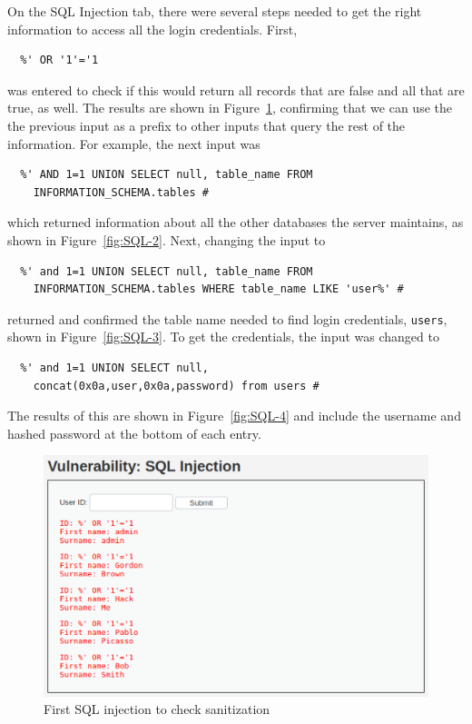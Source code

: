 \documentclass[11pt]{article}
\begin{document}
On the SQL Injection tab, there were several steps needed to get the right information to access all the login credentials. First,
\begin{verbatim}
  %' OR '1'='1
\end{verbatim}
was entered to check if this would return all records that are false and all that are true, as well. The results are shown in
Figure~\ref{fig:SQL-1}, confirming that we can use the the previous input as a prefix to other inputs that query the rest of the
information. For example, the next input was
\begin{verbatim}
  %' AND 1=1 UNION SELECT null, table_name FROM
    INFORMATION_SCHEMA.tables #
\end{verbatim}
which returned information about all the other databases the server maintains, as shown in Figure~\ref{fig:SQL-2}. Next, changing the
input to
\begin{verbatim}
  %' and 1=1 UNION SELECT null, table_name FROM
    INFORMATION_SCHEMA.tables WHERE table_name LIKE 'user%' #
\end{verbatim}
returned and confirmed the table name needed to find login credentials, \verb|users|, shown in Figure~\ref{fig:SQL-3}. To get the
credentials, the input was changed to
\begin{verbatim}
  %' and 1=1 UNION SELECT null,
    concat(0x0a,user,0x0a,password) from users #
\end{verbatim}
The results of this are shown in Figure~\ref{fig:SQL-4} and include the username and hashed password at the bottom of each entry.
\begin{figure}[htbp]
  \centering
  \includegraphics[width=1\linewidth]{./SQL-1.png}
  \caption{\label{fig:SQL-1}
  First SQL injection to check sanitization}
\end{figure}
\end{document}
